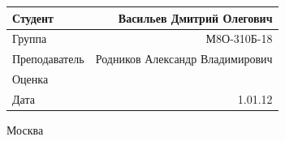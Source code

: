 \documentclass[a4paper,12pt]{article} %
\newcommand{\MAIStudentName}{Васильев Дмитрий Олегович}
\newcommand{\MAITeacherName}{Родников Александр Владимирович}
\newcommand{\MAIGroup}{М8О-310Б-18}
\newcommand{\MAIDate}{1.01.12}
\begin{document}
\begin{titlepage}
	\vfill\vfill
	
	\begin{minipage}{1\textwidth}
		\begin{flushright}
			\begin{tabular}{|l|r|}
				\hline 
				Студент & \MAIStudentName \\ 
				\hline 
				Группа & \MAIGroup \\ 
				\hline 
				Преподаватель & \MAITeacherName \\ 
				\hline 
				Оценка & \\ 
				\hline 
				Дата & \MAIDate \\ 
				\hline 
			\end{tabular} 
		\end{flushright}
	\end{minipage}
	
	
	
	\vfill\vfill\vfill
	
	{\large Москва \the\year{}} 
	
\end{titlepage}

\end{document}
